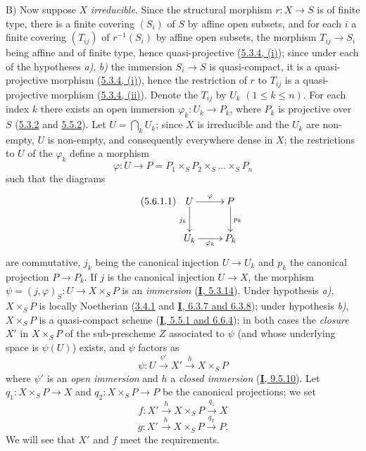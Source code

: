 B) Now suppose $X$ \emph{irreducible}. Since the structural morphism
$r:X\to S$ is of finite type, there is a finite covering $(S_i)$ of $S$ by
affine open subsets, and for each $i$ a finite covering $(T_{ij})$ of
$r^{-1}(S_i)$ by affine open subsets, the morphism $T_{ij}\to S_i$ being
affine and of finite type, hence quasi-projective
(\hyperref[II.5.3.4]{5.3.4, (i)}); since under each of the hypotheses \emph{a)},
\emph{b)} the immersion $S_i\to S$ is quasi-compact, it is a quasi-projective
morphism (\hyperref[II.5.3.4]{5.3.4, (i)}), hence the restriction of
$r$ to $T_{ij}$ is a quasi-projective morphism
(\hyperref[II.5.3.4]{5.3.4, (ii)}). Denote the $T_{ij}$ by $U_k$
$(1\leq k\leq n)$. For each index $k$ there exists an open immersion
$\varphi_k:U_k\to P_k$, where $P_k$ is projective over $S$
(\hyperref[II.5.3.2]{5.3.2} and \hyperref[II.5.5.2]{5.5.2}). Let
$U=\bigcap_kU_k$; since $X$ is irreducible and the $U_k$ are non-empty, $U$ is
non-empty, and consequently everywhere dense in $X$; the restrictions to $U$
of the $\varphi_k$ define a morphism
\[
\varphi:U\to P=P_1\times_SP_2\times_S\ldots\times_SP_n
\]
such that the diagrams
\[
\tag{5.6.1.1}
\label{II.5.6.1.1}
\xymatrix{
U\ar[r]^\varphi\ar[d]_{j_k} & P\ar[d]^{p_k}\\
U_k\ar[r]_{\varphi_k} & P_k
}
\]
are commutative, $j_k$ being the canonical injection $U\to U_k$ and $p_k$ the
canonical projection $P\to P_k$. If $j$ is the canonical injection $U\to X$,
the morphism $\psi=(j,\varphi)_S:U\to X\times_SP$ is an \emph{immersion}
(\hyperref[I.5.3.14]{\textbf{I}, 5.3.14}). Under hypothesis \emph{a)}, $X\times_SP$ is
locally Noetherian (\hyperref[II.3.4.1]{3.4.1} and
\hyperref[I.6.3.7]{\textbf{I}, 6.3.7 and 6.3.8}); under hypothesis \emph{b)},
$X\times_SP$ is a quasi-compact scheme
(\hyperref[I.5.5.1]{\textbf{I}, 5.5.1 and 6.6.4}); in both cases the \emph{closure}
$X'$ in $X\times_SP$ of the sub-prescheme $Z$ associated to $\psi$ (and whose
underlying space is $\psi(U)$) exists, and $\psi$ factors as
\[
\tag{5.6.1.2}
\label{II.5.6.1.2}
\psi:U\xrightarrow{\psi'}X'\xrightarrow{h}X\times_SP
\]
where $\psi'$ is an \emph{open immersion} and $h$ a \emph{closed immersion}
(\hyperref[I.9.5.10]{\textbf{I}, 9.5.10}). Let
$q_1:X\times_SP\to X$ and $q_2:X\times_SP\to P$ be the canonical projections;
we set
\[
\tag{5.6.1.3}
\label{II.5.6.1.3}
f:X'\xrightarrow{h}X\times_SP\xrightarrow{q_1}X
\]
\[
\tag{5.6.1.4}
\label{II.5.6.1.4}
g:X'\xrightarrow{h}X\times_SP\xrightarrow{q_2}P.
\]
We will see that $X'$ and $f$ meet the requirements.

